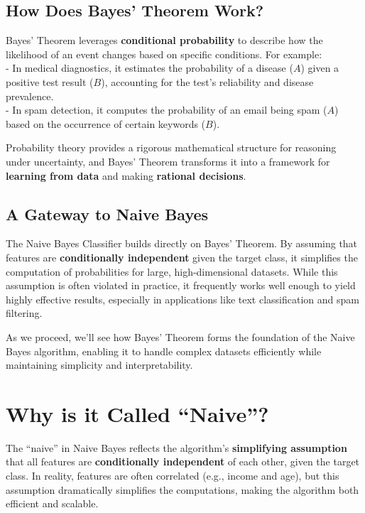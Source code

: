 \documentclass[
]{book}
\theoremstyle{definition}
\theoremstyle{definition}
\theoremstyle{definition}
\theoremstyle{definition}
\theoremstyle{remark}
\begin{document}
\subsection*{How Does Bayes' Theorem Work?}\label{how-does-bayes-theorem-work}

Bayes' Theorem leverages \textbf{conditional probability} to describe how the likelihood of an event changes based on specific conditions. For example:\\
- In medical diagnostics, it estimates the probability of a disease (\(A\)) given a positive test result (\(B\)), accounting for the test's reliability and disease prevalence.\\
- In spam detection, it computes the probability of an email being spam (\(A\)) based on the occurrence of certain keywords (\(B\)).

Probability theory provides a rigorous mathematical structure for reasoning under uncertainty, and Bayes' Theorem transforms it into a framework for \textbf{learning from data} and making \textbf{rational decisions}.

\subsection*{A Gateway to Naive Bayes}\label{a-gateway-to-naive-bayes}

The Naive Bayes Classifier builds directly on Bayes' Theorem. By assuming that features are \textbf{conditionally independent} given the target class, it simplifies the computation of probabilities for large, high-dimensional datasets. While this assumption is often violated in practice, it frequently works well enough to yield highly effective results, especially in applications like text classification and spam filtering.

As we proceed, we'll see how Bayes' Theorem forms the foundation of the Naive Bayes algorithm, enabling it to handle complex datasets efficiently while maintaining simplicity and interpretability.

\section{Why is it Called ``Naive''?}\label{why-is-it-called-naive}

The ``naive'' in Naive Bayes reflects the algorithm's \textbf{simplifying assumption} that all features are \textbf{conditionally independent} of each other, given the target class. In reality, features are often correlated (e.g., income and age), but this assumption dramatically simplifies the computations, making the algorithm both efficient and scalable.
\end{document}
